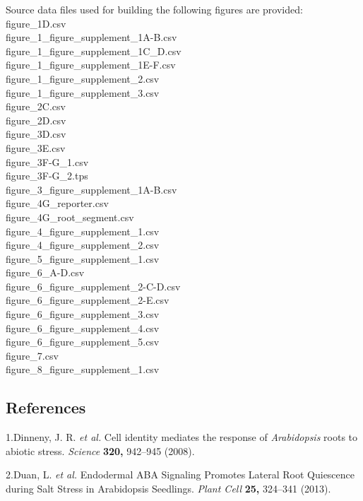 \documentclass[]{article}
\begin{document}
Source data files used for building the following figures are provided:
figure\_1D.csv\\figure\_1\_figure\_supplement\_1A-B.csv\\figure\_1\_figure\_supplement\_1C\_D.csv\\figure\_1\_figure\_supplement\_1E-F.csv\\figure\_1\_figure\_supplement\_2.csv\\figure\_1\_figure\_supplement\_3.csv\\figure\_2C.csv\\figure\_2D.csv\\figure\_3D.csv\\figure\_3E.csv\\figure\_3F-G\_1.csv\\figure\_3F-G\_2.tps\\figure\_3\_figure\_supplement\_1A-B.csv\\figure\_4G\_reporter.csv\\figure\_4G\_root\_segment.csv\\figure\_4\_figure\_supplement\_1.csv\\figure\_4\_figure\_supplement\_2.csv\\figure\_5\_figure\_supplement\_1.csv\\figure\_6\_A-D.csv\\figure\_6\_figure\_supplement\_2-C-D.csv\\figure\_6\_figure\_supplement\_2-E.csv\\figure\_6\_figure\_supplement\_3.csv\\figure\_6\_figure\_supplement\_4.csv\\figure\_6\_figure\_supplement\_5.csv\\figure\_7.csv\\figure\_8\_figure\_supplement\_1.csv

\pagebreak

\subsection*{References}\label{references}

1.Dinneny, J. R. \emph{et al.} Cell identity mediates the response of
\emph{Arabidopsis} roots to abiotic stress. \emph{Science} \textbf{320,}
942--945 (2008).

2.Duan, L. \emph{et al.} Endodermal ABA Signaling Promotes Lateral Root
Quiescence during Salt Stress in Arabidopsis Seedlings. \emph{Plant
Cell} \textbf{25,} 324--341 (2013).
\end{document}
